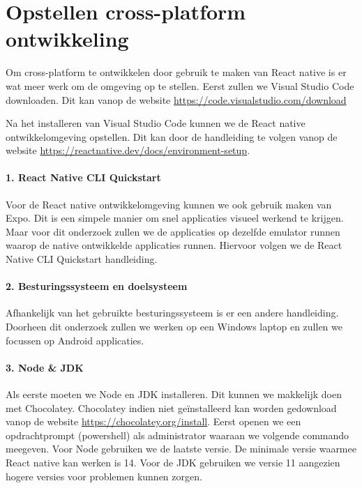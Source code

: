 \section{Opstellen cross-platform ontwikkeling}
Om cross-platform te ontwikkelen door gebruik te maken van React native is er wat meer werk om 
de omgeving op te stellen. Eerst zullen we Visual Studio Code downloaden. 
Dit kan vanop de website \url{https://code.visualstudio.com/download} 

Na het installeren van Visual Studio Code kunnen we de React native ontwikkelomgeving opstellen. 
Dit kan door de handleiding te volgen vanop de website \url{https://reactnative.dev/docs/environment-setup}.

\paragraph{1. React Native CLI Quickstart}
Voor de React native ontwikkelomgeving kunnen we ook gebruik maken van Expo. 
Dit is een simpele manier om snel applicaties visueel werkend te krijgen. 
Maar voor dit onderzoek zullen we de applicaties op dezelfde emulator runnen waarop de native 
ontwikkelde applicaties runnen. Hiervoor volgen we de React Native CLI Quickstart handleiding. 

\paragraph{2. Besturingssysteem en doelsysteem}
Afhankelijk van het gebruikte besturingssysteem is er een andere handleiding. 
Doorheen dit onderzoek zullen we werken op een Windows laptop en zullen we focussen op Android applicaties.

\paragraph{3. Node \& JDK}
Als eerste moeten we \gls{Node} en \gls{JDK} installeren. Dit kunnen we makkelijk 
doen met \gls{Chocolatey}. Chocolatey indien niet geïnstalleerd kan worden gedownload 
vanop de website \url{https://chocolatey.org/install}. Eerst openen we een 
opdrachtprompt (powershell) als administrator waaraan we volgende commando meegeven.
Voor Node gebruiken we de laatste versie. De minimale versie waarmee React native kan werken is 14. 
Voor de JDK gebruiken we versie 11 aangezien hogere versies voor problemen kunnen zorgen.

